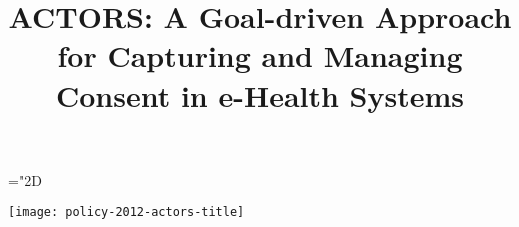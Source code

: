 \documentclass[10pt, conference, compsocconf]{IEEEtran}
\begin{document}
\mathchardef\mhyphen="2D

\texttt{[image: policy-2012-actors-title]}

\pagestyle{plain}

\title{ACTORS: A Goal-driven Approach for Capturing and Managing Consent in e-Health Systems}

\iffalse
\author{
\IEEEauthorblockN{Muhammad Rizwan Asghar}
\IEEEauthorblockA{CREATE-NET\\
International Research Center\\
Trento, Italy\\
asghar@create-net.org}
\and
\IEEEauthorblockN{Giovanni Russello}
\IEEEauthorblockA{Department of Computer Science\\
The University of Auckland\\
Auckland, New Zealand\\
g.russello@auckland.ac.nz}
}


\author[cn,disi]{Muhammad Rizwan Asghar}
\ead{asghar@create-net.org}
\author[cn,disi]{Mihaela Ion}
\ead{ion@create-net.org}
\author[nz]{Giovanni Russello}
\ead{g.russello@auckland.ac.nz}
\author[disi]{Bruno Crispo}
\ead{crispo@disi.unitn.it}

\address[cn]{CREATE-NET, International Research Center, Trento Italy}

\address[nz]{Department of Computer Science, The University of Auckland, Auckland New Zealand}

\address[disi]{Department of Information Engineering and Computer Science, University of Trento, Trento Italy}


\fi

\author{
}

\maketitle
\end{document}
